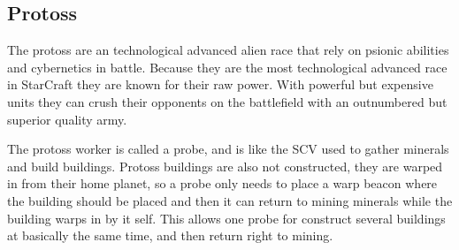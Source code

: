 \subsection{Protoss}
The protoss are an technological advanced alien race that rely on psionic abilities and cybernetics in battle. Because they are the most technological advanced race in StarCraft they are known for their raw power. With powerful but expensive units they can crush their opponents on the battlefield with an outnumbered but superior quality army.

The protoss worker is called a probe, and is like the SCV used to gather minerals and build buildings. Protoss buildings are also not constructed, they are warped in from their home planet, so a probe only needs to place a warp beacon where the building should be placed and then it can return to mining minerals while the building warps in by it self. This allows one probe for construct several buildings at basically the same time, and then return right to mining.
